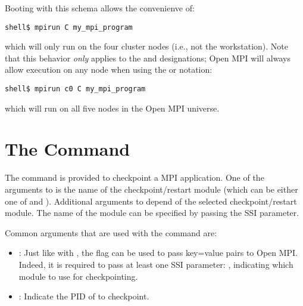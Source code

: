Booting with this schema allows the convenienve of:

\lstset{style=lam-cmdline}
\begin{lstlisting}
shell$ mpirun C my_mpi_program
\end{lstlisting}

\noindent which will only run  on the four
cluster nodes (i.e., not the workstation).  
%
Note that this behavior {\em only} applies to the  and 
designations; Open MPI will always allow execution on any node when using
the  or  notation:

\lstset{style=lam-cmdline}
\begin{lstlisting}
shell$ mpirun c0 C my_mpi_program
\end{lstlisting}

\noindent which will run  on all five nodes
in the Open MPI universe.


\section{The  Command}
\label{sec:commands-lamcheckpoint}


The  command is provided to checkpoint a MPI
application.  One of the arguments to  is the name
of the checkpoint/restart module (which can be either one of
 and ).  Additional arguments to
 depend of the selected checkpoint/restart module.
The name of the module can be specified by passing the  SSI
parameter.

Common arguments that are used with the  command
are:

\begin{itemize}
\item {}: Just like with , the 
  flag can be used to pass key=value pairs to Open MPI.  Indeed, it is
  required to pass at least one SSI parameter: ,
  indicating which  module to use for checkpointing.
  
\item {}: Indicate the PID of  to checkpoint.
\end{itemize}

